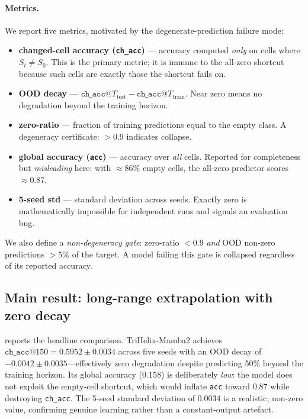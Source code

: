 \paragraph{Metrics.}
We report five metrics, motivated by the degenerate-prediction failure mode:
\begin{itemize}[leftmargin=*,itemsep=1pt]
  \item \textbf{changed-cell accuracy (\texttt{ch\_acc})} --- accuracy computed
        \emph{only} on cells where $S_t \neq S_0$. This is the primary metric;
        it is immune to the all-zero shortcut because such cells are exactly
        those the shortcut fails on.
  \item \textbf{OOD decay} --- $\texttt{ch\_acc}@T_{\text{test}} -
        \texttt{ch\_acc}@T_{\text{train}}$. Near zero means no degradation
        beyond the training horizon.
  \item \textbf{zero-ratio} --- fraction of training predictions equal to the
        empty class. A degeneracy certificate: $>0.9$ indicates collapse.
  \item \textbf{global accuracy (\texttt{acc})} --- accuracy over \emph{all}
        cells. Reported for completeness but \emph{misleading} here: with
        $\approx 86\%$ empty cells, the all-zero predictor scores $\approx
        0.87$.
  \item \textbf{5-seed std} --- standard deviation across seeds. Exactly zero
        is mathematically impossible for independent runs and signals an
        evaluation bug.
\end{itemize}
We also define a \emph{non-degeneracy gate}: zero-ratio $<0.9$ \emph{and} OOD
non-zero predictions $>5\%$ of the target. A model failing this gate is
collapsed regardless of its reported accuracy.

\subsection{Main result: long-range extrapolation with zero decay}
\label{sec:exp-main}

 reports the headline comparison. TriHelix-Mamba2 achieves
$\texttt{ch\_acc}@150 = 0.5952\pm0.0034$ across five seeds with an OOD decay of
$-0.0042\pm0.0035$---effectively zero degradation despite predicting 50\%
beyond the training horizon. Its global accuracy ($0.158$) is deliberately
\emph{low}: the model does not exploit the empty-cell shortcut, which would
inflate \texttt{acc} toward $0.87$ while destroying \texttt{ch\_acc}. The
5-seed standard deviation of $0.0034$ is a realistic, non-zero value,
confirming genuine learning rather than a constant-output artefact.

